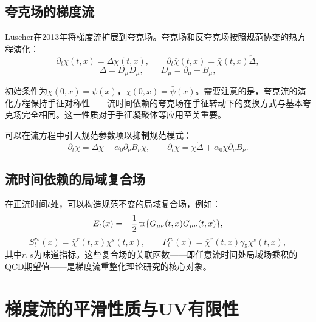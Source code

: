 \documentclass[12pt,a4paper]{ctexart}
\theoremstyle{definition}
\begin{document}
\subsection{夸克场的梯度流}

L\"uscher在2013年将梯度流扩展到夸克场\cite{Luscher2013}。夸克场和反夸克场按照规范协变的热方程演化：
\begin{equation}
\partial_t \chi(t,x) = \Delta \chi(t,x), \qquad
\partial_t \bar{\chi}(t,x) = \bar{\chi}(t,x) \overleftarrow{\Delta},
\label{eq:flow_quark}
\end{equation}
\begin{equation}
\Delta = D_\mu D_\mu, \qquad D_\mu = \partial_\mu + B_\mu,
\label{eq:laplacian}
\end{equation}

初始条件为$\chi(0,x) = \psi(x)$，$\bar{\chi}(0,x) = \bar{\psi}(x)$。需要注意的是，夸克流的演化方程保持手征对称性——流时间依赖的夸克场在手征转动下的变换方式与基本夸克场完全相同。这一性质对于手征凝聚体等应用至关重要。

可以在流方程中引入规范参数项以抑制规范模式\cite{Luscher2013}：
\begin{equation}
\partial_t \chi = \Delta \chi - \alpha_0 \partial_\nu B_\nu \chi, \qquad
\partial_t \bar{\chi} = \bar{\chi} \overleftarrow{\Delta} + \alpha_0 \bar{\chi} \partial_\nu B_\nu.
\label{eq:flow_quark_fixed}
\end{equation}

\subsection{流时间依赖的局域复合场}

在正流时间$t$处，可以构造规范不变的局域复合场，例如\cite{Luscher2010,Luscher2013}：
\begin{equation}
E_t(x) = -\frac{1}{2}\tr{G_{\mu\nu}(t,x) G_{\mu\nu}(t,x)},
\label{eq:Et}
\end{equation}
\begin{equation}
S_t^{rs}(x) = \bar{\chi}^r(t,x) \chi^s(t,x), \qquad
P_t^{rs}(x) = \bar{\chi}^r(t,x) \gamma_5 \chi^s(t,x),
\label{eq:St_Pt}
\end{equation}
其中$r,s$为味道指标。这些复合场的关联函数——即任意流时间处局域场乘积的QCD期望值——是梯度流重整化理论研究的核心对象。

\section{梯度流的平滑性质与UV有限性}\label{sec:smoothing}
\end{document}
